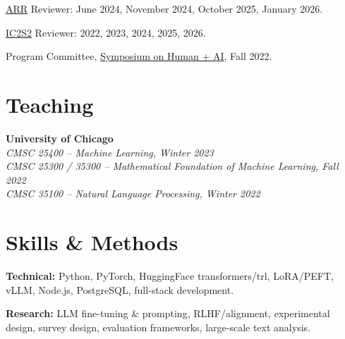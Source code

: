 \documentclass[11pt,letterpaper]{article}
\begin{document}
\begin{cvitems}
    \item \href{https://aclrollingreview.org}{ARR} Reviewer: June 2024, November 2024, October 2025, January 2026.
    \item \href{https://ic2s2-2026.org}{IC2S2} Reviewer: 2022, 2023, 2024, 2025, 2026.
    \item Program Committee, \href{https://datascience.uchicago.edu/events/human-ai-conference/}{Symposium on Human + AI}, Fall 2022.
\end{cvitems}

\section*{Teaching}

\textbf{University of Chicago}\\
\hspace*{2em}\textit{CMSC 25400 -- Machine Learning, Winter 2023}\\
\hspace*{2em}\textit{CMSC 25300 / 35300 -- Mathematical Foundation of Machine Learning, Fall 2022}\\
\hspace*{2em}\textit{CMSC 35100 -- Natural Language Processing, Winter 2022}

\section*{Skills \& Methods}
\begin{cvitems}
    \item \textbf{Technical:} Python, PyTorch, HuggingFace transformers/trl, LoRA/PEFT, vLLM, Node.js, PostgreSQL, full-stack development.
    \item \textbf{Research:} LLM fine-tuning \& prompting, RLHF/alignment, experimental design, survey design, evaluation frameworks, large-scale text analysis.
\end{cvitems}
\end{document}
